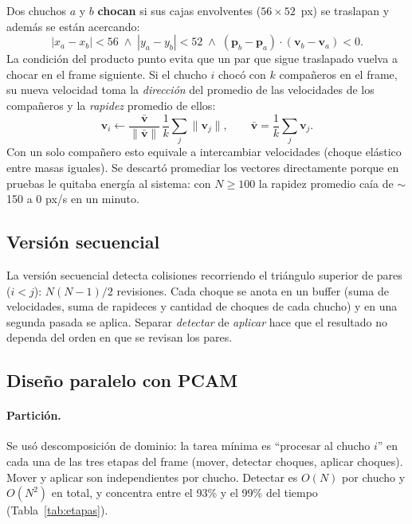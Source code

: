 \documentclass[11pt,letterpaper]{article}
\begin{document}
Dos chuchos $a$ y $b$ \textbf{chocan} si sus cajas envolventes
($56\times52$~px) se traslapan y además se están acercando:
\begin{equation}
  |x_a - x_b| < 56 \;\wedge\; |y_a - y_b| < 52 \;\wedge\;
  (\mathbf{p}_b - \mathbf{p}_a)\cdot(\mathbf{v}_b - \mathbf{v}_a) < 0 .
\end{equation}
La condición del producto punto evita que un par que sigue traslapado vuelva a
chocar en el frame siguiente. Si el chucho $i$ chocó con $k$ compañeros en el
frame, su nueva velocidad toma la \emph{dirección} del promedio de las
velocidades de los compañeros y la \emph{rapidez} promedio de ellos:
\begin{equation}
  \mathbf{v}_i \leftarrow \frac{\bar{\mathbf{v}}}{\lVert\bar{\mathbf{v}}\rVert}\,
  \frac{1}{k}\sum_{j}\lVert\mathbf{v}_j\rVert,
  \qquad \bar{\mathbf{v}} = \frac{1}{k}\sum_j \mathbf{v}_j .
\end{equation}
Con un solo compañero esto equivale a intercambiar velocidades (choque elástico
entre masas iguales). Se descartó promediar los vectores directamente porque en
pruebas le quitaba energía al sistema: con $N\ge100$ la rapidez promedio caía de
$\sim$150 a 0 px/s en un minuto.

\subsection{Versión secuencial}

La versión secuencial detecta colisiones recorriendo el triángulo superior de
pares ($i<j$): $N(N-1)/2$ revisiones. Cada choque se anota en un buffer (suma
de velocidades, suma de rapideces y cantidad de choques de cada chucho) y en
una segunda pasada se aplica. Separar \emph{detectar} de \emph{aplicar} hace
que el resultado no dependa del orden en que se revisan los pares.

\subsection{Diseño paralelo con PCAM}\label{sec:pcam}

\paragraph{Partición.} Se usó descomposición de dominio: la tarea mínima es
``procesar al chucho $i$'' en cada una de las tres etapas del frame (mover,
detectar choques, aplicar choques). Mover y aplicar son independientes por
chucho. Detectar es $O(N)$ por chucho y $O(N^2)$ en total, y concentra entre el 93\% y el 99\% del tiempo
(Tabla~\ref{tab:etapas}).
\end{document}
